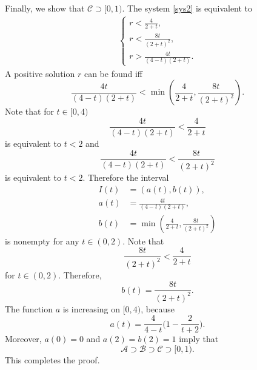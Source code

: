 \documentclass[reqno]{amsart}
\begin{document}
Finally, we show that $\mathcal C \supset [0,1)$.
The system \eqref{sys2} is equivalent to
	\begin{align}\label{sys4}
	\begin{cases}
	r <   \frac{4}{2+t},\\
	r < \frac{8t}{(2+t)^2},\\
	r > \frac{4t}{(4-t)(2+t)}.
	\end{cases}
	\end{align}
 A positive solution $r$ can be found iff
	\[
	\frac{4t}{(4-t)(2+t)} < \min \left(\frac{4}{2+t}, \frac{8t}{(2+t)^2}  \right) .
	\]
Note that for $t \in [0,4)$
	\[
	\frac{4t}{(4-t)(2+t)} < \frac{4}{2+t}
	\]
is equivalent to $t <2$ and
	\[
	\frac{4t}{(4-t)(2+t)} < \frac{8t}{(2+t)^2}
	\]
is equivalent to $t <2.$
Therefore the interval
	\begin{align*}
	I(t) &= (a(t),b(t)), \\
	a(t) &= \frac{4t}{(4-t)(2+t)} , \\
	b(t) &= \min \left(\frac{4}{2+t}, \frac{8t}{(2+t)^2}  \right) 
	\end{align*}
is nonempty for any $t \in (0,2).$ Note that
	\[
	\frac{8t}{(2+t)^2} < \frac{4}{2+t}
	\]
for $t \in (0,2).$ Therefore,
	\[
	b(t) = \frac{8t}{(2+t)^2}.
	\]
The function $a$ is increasing on $[0,4)$, because
	\[
	a(t)
	= \frac{4}{4-t}\bigg( 1 - \frac{2}{t+2} \bigg).
	\]
Moreover, $a(0)=0 $ and $ a(2)=b(2)=1$ imply that 
	\[
	\mathcal{A} \supset \mathcal{B} \supset \mathcal{C} \supset [0,1).
	\]
This completes the proof.


%
%


%


%
%
\end{document}
